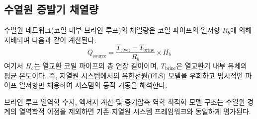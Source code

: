 \subsection{수열원 증발기 채열량}

수열원 네트워크(코일 내부 브라인 루프)의 채열량은 코일 파이프의 열저항 $R_b$에 의해 지배되며 다음과 같이 계산된다:
\begin{equation}\label{eq:wshp-Qsource}
  Q_\text{source} = \frac{T_{\text{river}} - T_\text{brine}}{R_b} \times H_b
\end{equation}
여기서 $H_b$는 열교환 코일 파이프의 총 연장 길이이며, $T_\text{brine}$은 열교환기 내부 유체의 평균 온도이다. 즉, 지열원 시스템에서의 유한선원(FLS) 모델을 우회하고 명시적인 파이프 열저항만 채용하여 시스템의 동적 거동을 해석한다. 

브라인 루프 열역학 수지, 엑서지 계산 및 증기압축 역학 최적화 모델 구조는 수열원 경계의 열역학적 이점을 제외하면 기존 지열원 시스템 프레임워크와 동일하게 평가된다.

